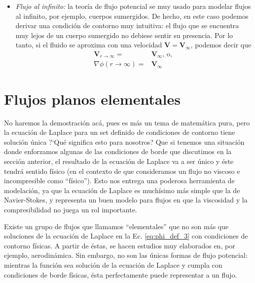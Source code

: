 \begin{itemize}
\item \emph{Flujo al infinito:} la teoría de flujo potencial se muy usado para modelar flujos al infinito, por ejemplo, cuerpos sumergidos.
De hecho, en este caso podemos derivar una condición de contorno muy intuitiva: el flujo que se encuentra muy lejos de un cuerpo sumergido no debiese sentir su presencia.
Por lo tanto, si el fluido se aproxima con una velocidad $\mathbf{V}=\mathbf{V}_\infty$, podemos decir que
%
\begin{align}
\mathbf{V}_{r\to\infty}=&\mathbf{V}_\infty\text{, o, }\nonumber\\
\nabla\phi(r\to\infty) =&\mathbf{V}_\infty 
\end{align}
\end{itemize}


\section*{Flujos planos elementales}
No haremos la demostración acá, pues es más un tema de matemática pura, pero la ecuación de Laplace para un set definido de condiciones de contorno tiene solución única
\mbox{?`}Qué significa esto para nosotros?
Que si tenemos una situación donde enforzamos algunas de las condiciones de borde que discutimos en la sección anterior, el resultado de la ecuación de Laplace va a ser único y éste tendrá sentido físico (en el contexto de que consideramos un flujo no viscoso e incompresible como ``físico'').
Esto nos entrega una poderosa herramienta de modelación, ya que la ecuación de Laplace es muchísimo más simple que la de Navier-Stokes, y representa un buen modelo para flujos en que la viscosidad y la compresibilidad no juega un rol importante.

Existe un grupo de flujos que llamamos ``elementales'' que no son más que soluciones de la ecuación de Laplace en la Ec. \eqref{eq:phi_def_3} con condiciones de contorno físicas.
A partir de éstas, se hacen estudios muy elaborados en, por ejemplo, aerodinámica.
Sin embargo, no son las únicas formas de flujo potencial: mientras la función sea solución de la ecuación de Laplace y cumpla con condiciones de borde físicas, ésta perfectamente puede representar a un flujo.

